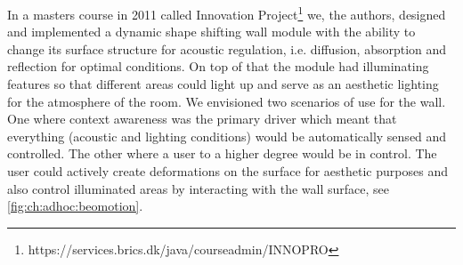 In a masters course in 2011 called Innovation Project\footnote{https://services.brics.dk/java/courseadmin/INNOPRO} we, the authors, designed and implemented a dynamic shape shifting wall module with the ability to change its surface structure for acoustic regulation, i.e. diffusion, absorption and reflection for optimal conditions.
On top of that the module had illuminating features so that different areas could light up and serve as an aesthetic lighting for the atmosphere of the room. 
We envisioned two scenarios of use for the wall.
One where context awareness was the primary driver which meant that everything (acoustic and lighting conditions) would be automatically sensed and controlled.
The other where a user to a higher degree would be in control.
The user could actively create deformations on the surface for aesthetic purposes and also control illuminated areas by interacting with the wall surface, see \ref{fig:ch:adhoc:beomotion}.  
\blank
{} 

